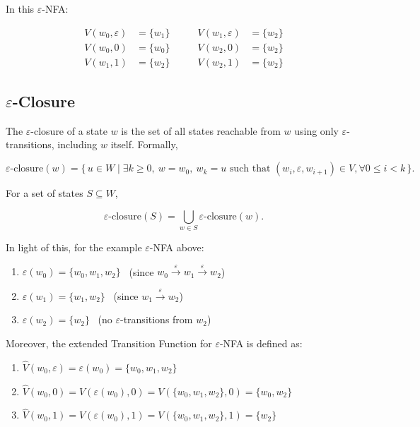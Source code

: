 \documentclass[12pt,a4paper,openany]{article}
\begin{document}
In this $\varepsilon$-NFA:

\[
\begin{aligned}
        V(w_0, \varepsilon) &= \{w_1\} \qquad & V(w_1, \varepsilon) &= \{w_2\} \\
        V(w_0, 0)           &= \{w_0\} \qquad & V(w_2, 0)           &= \{w_2\} \\
        V(w_1, 1)           &= \{w_2\} \qquad & V(w_2, 1)           &= \{w_2\}
\end{aligned}
\]


\subsection{$\varepsilon$-Closure}

The $\varepsilon$-closure of a state $w$ is the set of all states reachable 
from $w$ using only $\varepsilon$-transitions, including $w$ itself. Formally,

\[
\varepsilon\text{-closure}(w)
=
\{\, u \in W \mid \exists k \ge 0,\ w = w_0,\ w_k = u
\text{ such that } (w_i,\varepsilon,w_{i+1}) \in V,
\forall 0 \le i < k \,\}.
\]


For a set of states $S \subseteq W$,

\[
\varepsilon\text{-closure}(S)
=
\bigcup_{w \in S} \varepsilon\text{-closure}(w).
\]

In light of this, for the example $\varepsilon$-NFA above:

\begin{enumerate}
    \item $\varepsilon(w_0) = \{ w_0, w_1, w_2 \}$ \ 
    (since $w_0 \xrightarrow{\varepsilon} w_1 \xrightarrow{\varepsilon} w_2$)

    \item $\varepsilon(w_1) = \{ w_1, w_2 \}$ \ 
    (since $w_1 \xrightarrow{\varepsilon} w_2$)

    \item $\varepsilon(w_2) = \{ w_2 \}$ \
    (no $\varepsilon$-transitions from $w_2$)
\end{enumerate}

Moreover, the extended Transition Function for $\varepsilon$-NFA is defined as:

\begin{enumerate}
    \item $\hat{V}(w_0,\varepsilon)
      = \varepsilon(w_0)
      = \{w_0, w_1, w_2\}$

    \item $\hat{V}(w_0,0)
      = V(\varepsilon(w_0),0)
      = V(\{w_0,w_1,w_2\},0)
      = \{w_0,w_2\}$

    \item $\hat{V}(w_0,1)
      = V(\varepsilon(w_0),1)
      = V(\{w_0,w_1,w_2\},1)
      = \{w_2\}$
\end{enumerate}
\end{document}
